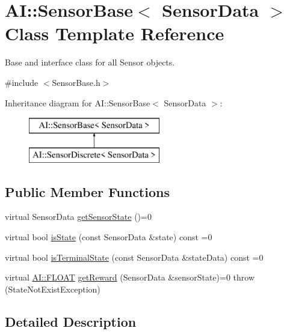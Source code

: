 \hypertarget{classAI_1_1SensorBase}{\section{A\-I\-:\-:Sensor\-Base$<$ Sensor\-Data $>$ Class Template Reference}
\label{classAI_1_1SensorBase}
}


Base and interface class for all Sensor objects.  




{\ttfamily \#include $<$Sensor\-Base.\-h$>$}

Inheritance diagram for A\-I\-:\-:Sensor\-Base$<$ Sensor\-Data $>$\-:\begin{figure}[H]
\begin{center}
\leavevmode
\includegraphics[height=2.000000cm]{classAI_1_1SensorBase}
\end{center}
\end{figure}
\subsection*{Public Member Functions}
\begin{DoxyCompactItemize}
\item 
virtual Sensor\-Data \hyperlink{classAI_1_1SensorBase_aad6f932417a7f8584c8a3f73ee096712}{get\-Sensor\-State} ()=0
\item 
virtual bool \hyperlink{classAI_1_1SensorBase_ad7a4098ecb3050be01d12b6c64fe0880}{is\-State} (const Sensor\-Data \&state) const =0
\item 
virtual bool \hyperlink{classAI_1_1SensorBase_acbfe2bd6f8bf57f01f4de881142cd437}{is\-Terminal\-State} (const Sensor\-Data \&state\-Data) const =0
\item 
virtual \hyperlink{namespaceAI_a41b74884a20833db653dded3918e05c3}{A\-I\-::\-F\-L\-O\-A\-T} \hyperlink{classAI_1_1SensorBase_a5f28a8bd01fc296860e2b04115d55f93}{get\-Reward} (Sensor\-Data \&sensor\-State)=0  throw (\-State\-Not\-Exist\-Exception)
\end{DoxyCompactItemize}


\subsection{Detailed Description}
